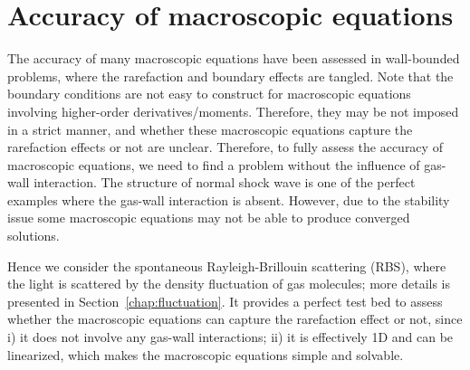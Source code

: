 \section{Accuracy of macroscopic equations}\label{RBS:macroscopic}








The accuracy of many macroscopic equations have been assessed in wall-bounded problems, where the rarefaction and boundary effects are tangled. Note that the boundary conditions are not easy to construct for macroscopic equations involving higher-order derivatives/moments. Therefore, they may be not imposed in a strict manner, and whether these macroscopic equations capture the rarefaction effects or not are unclear. Therefore, to fully assess the accuracy of macroscopic equations, we need to find a problem without the influence of gas-wall interaction. The structure of normal shock wave is one of the perfect examples where the gas-wall interaction is absent. However, due to the stability issue some macroscopic equations may not be able to produce converged solutions. 


Hence we consider the spontaneous Rayleigh-Brillouin scattering (RBS), where the light is scattered by the density fluctuation of gas molecules; more details is presented in Section~\ref{chap:fluctuation}. It provides a perfect test bed to assess whether the macroscopic equations can capture the rarefaction effect or not, since i) it does not involve any gas-wall interactions; ii) it is effectively 1D and can be linearized, which makes the macroscopic equations simple and solvable. 

